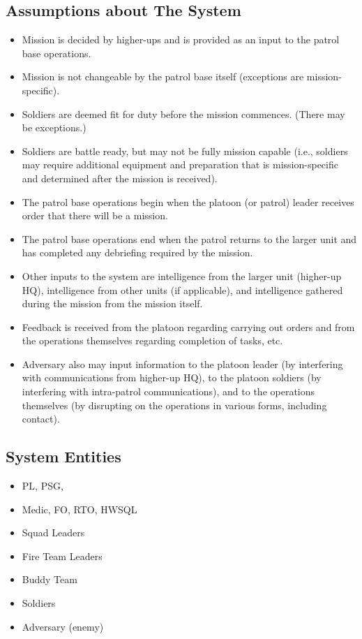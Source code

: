 \documentclass[../../main/main.tex]{subfiles}
\begin{document}
\subsection{Assumptions about The System}
\begin{itemize}
\item Mission is decided by higher-ups and is provided as an input to the patrol base operations.
\item Mission is not changeable by the patrol base itself (exceptions are mission-specific).
\item Soldiers are deemed fit for duty before the mission commences.   (There may be exceptions.)
\item Soldiers are battle ready, but may not be fully mission capable (i.e., soldiers may require additional equipment and preparation that is mission-specific and determined after the mission is received).
\item The patrol base operations begin when the platoon (or patrol) leader receives order that there will be a mission.
\item The patrol base operations end when the patrol returns to the larger unit and has completed any debriefing required by the mission.
\item Other inputs to the system are intelligence from the larger unit (higher-up HQ), intelligence from other units (if applicable), and intelligence gathered during the mission from the mission itself. 
\item Feedback is received from the platoon regarding carrying out orders and from the operations themselves regarding completion of tasks, etc.  
\item Adversary also may input information to the platoon leader (by interfering with communications from higher-up HQ), to the platoon soldiers (by interfering with intra-patrol communications), and to the operations themselves (by disrupting on the operations in various forms, including contact).
\end{itemize}


\subsection{System Entities}
\begin{itemize}
\item PL, PSG, 
\item Medic, FO, RTO, HWSQL
\item Squad Leaders
\item Fire Team Leaders
\item Buddy Team
\item Soldiers
\item Adversary (enemy)
\end{itemize}
\end{document}

